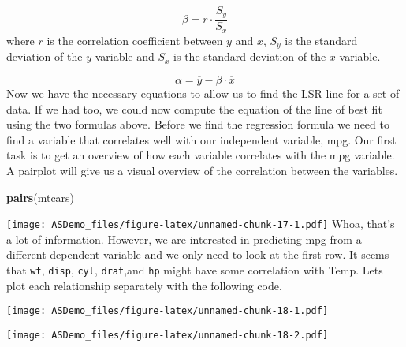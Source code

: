 \documentclass[]{book}
\newenvironment{Shaded}{\begin{snugshade}}{\end{snugshade}}
\newcommand{\KeywordTok}[1]{\textcolor[rgb]{0.13,0.29,0.53}{\textbf{#1}}}
\newcommand{\OperatorTok}[1]{\textcolor[rgb]{0.81,0.36,0.00}{\textbf{#1}}}
\newcommand{\NormalTok}[1]{#1}
\begin{document}
\[\beta = r \cdot \frac{S_y}{S_x}\] where \(r\) is the correlation
coefficient between \(y\) and \(x\), \(S_y\) is the standard deviation
of the \(y\) variable and \(S_x\) is the standard deviation of the \(x\)
variable.

\[\alpha = \overline y - \beta \cdot \overline x\] Now we have the
necessary equations to allow us to find the LSR line for a set of data.
If we had too, we could now compute the equation of the line of best fit
using the two formulas above. Before we find the regression formula we
need to find a variable that correlates well with our independent
variable, mpg. Our first task is to get an overview of how each variable
correlates with the mpg variable. A pairplot will give us a visual
overview of the correlation between the variables.

\begin{Shaded}
\begin{Highlighting}[]
\KeywordTok{pairs}\NormalTok{(mtcars)}
\end{Highlighting}
\end{Shaded}

\texttt{[image: ASDemo\_files/figure-latex/unnamed-chunk-17-1.pdf]} Whoa,
that's a lot of information. However, we are interested in predicting
mpg from a different dependent variable and we only need to look at the
first row. It seems that \texttt{wt}, \texttt{disp}, \texttt{cyl},
\texttt{drat},and \texttt{hp} might have some correlation with Temp.
Lets plot each relationship separately with the following code.

\begin{Shaded}
\end{Shaded}

\texttt{[image: ASDemo\_files/figure-latex/unnamed-chunk-18-1.pdf]}

\begin{Shaded}
\end{Shaded}

\texttt{[image: ASDemo\_files/figure-latex/unnamed-chunk-18-2.pdf]}

\begin{Shaded}
\end{Shaded}
\end{document}

